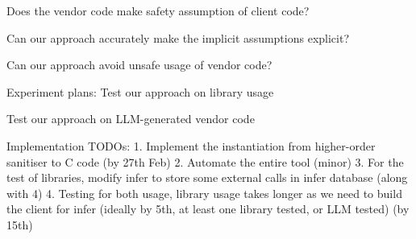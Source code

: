 Does the vendor code make safety assumption of client code?

Can our approach accurately make the implicit assumptions explicit?

Can our approach avoid unsafe usage of vendor code?

Experiment plans:
Test our approach on library usage

Test our approach on LLM-generated vendor code

Implementation TODOs:
1. Implement the instantiation from higher-order sanitiser to C code (by 27th Feb)
2. Automate the entire tool (minor)
3. For the test of libraries, modify infer to store some external calls in infer database (along with 4)
4. Testing for both usage, library usage takes longer as we need to build the client for infer (ideally by 5th, at least one library tested, or LLM tested) (by 15th)